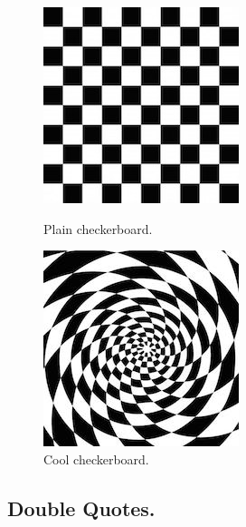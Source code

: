 \documentclass[pageno]{jpaper}
\begin{document}
\begin{figure}[htbb]
\begin{minipage}[b]{0.5\linewidth}
\centering
\includegraphics[width=.75\linewidth]{checkerboard-squares-black-white.jpg}
\caption{Plain checkerboard.}
\label{fig:side-a}
\end{minipage}
\hspace{0.5cm}
\begin{minipage}[b]{0.5\linewidth}
\centering
\includegraphics[width=.75\linewidth]{swirl-squares-black-white.jpg}
\caption{Cool checkerboard.}
\label{fig:side-b}
\end{minipage}
\end{figure}

\subsection{Double Quotes.}
\end{document}
